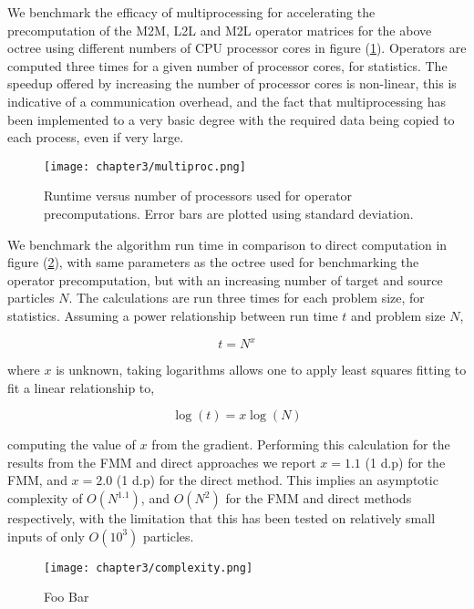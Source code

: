 We benchmark the efficacy of multiprocessing for accelerating the precomputation
of the \gls{M2M}, \gls{L2L} and \gls{M2L} operator matrices for the above octree
using different numbers of CPU processor cores in figure (\ref{fig:3_1_multiproc}).
Operators are computed three times for a given number of processor cores,
for statistics. The speedup offered by increasing the number of processor cores
is non-linear, this is indicative of a communication overhead, and the
fact that multiprocessing has been implemented to a very basic degree with
the required data being copied to each process, even if very large.

\begin{figure}[ht]
    \centering

  {\texttt{[image: chapter3/multiproc.png]}}
  \vspace{0pt}
    \caption{Runtime versus number of processors used for operator precomputations.
    Error bars are plotted using standard deviation.}
    \label{fig:3_1_multiproc}
\end{figure}

We benchmark the algorithm run time in comparison to direct computation in figure
(\ref{fig:3_1_complexity}), with same parameters as the octree used for benchmarking
the operator precomputation, but with an increasing number of target and source
particles $N$. The calculations are run three times for each problem size, for
statistics. Assuming a power relationship between run time $t$ and problem size $N$,

\begin{equation}
    t = N^x
\end{equation}

where $x$ is unknown, taking logarithms allows one to apply least squares fitting
to fit a linear relationship to,

\begin{equation}
    \log(t) = x \log(N)
\end{equation}

computing the value of $x$ from the gradient. Performing this calculation for the
results from the \gls{FMM} and direct approaches we report $x=1.1$ (1 d.p) for
the FMM, and $x=2.0$ (1 d.p) for the direct method. This implies an asymptotic
complexity of $O(N^{1.1})$, and $O(N^2)$ for the \gls{FMM} and direct methods
respectively, with the limitation that this has been tested on relatively
small inputs of only $O(10^3)$ particles.

\begin{figure}[ht]
    \centering

  {\texttt{[image: chapter3/complexity.png]}}
  \vspace{0pt}
    \caption{Foo Bar}
    \label{fig:3_1_complexity}
\end{figure}

